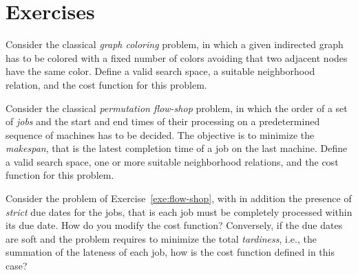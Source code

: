 \section{Exercises}

\begin{exercise}
Consider the classical \emph{graph coloring} problem, in which a given indirected graph has to be colored with a fixed number of colors avoiding that two adjacent nodes have the same color. Define a valid search space, a suitable neighborhood relation, and the cost function for this problem. 
\end{exercise}

\begin{exercise}\label{exe:flow-shop}
Consider the classical \emph{permutation flow-shop} problem, in which the order of a set of \emph{jobs} and the start and end times of their processing on a predetermined sequence of machines has to be decided. The objective is to minimize the \emph{makespan}, that is the latest completion time of a job on the last machine. Define a valid search space, one or more suitable neighborhood relations, and the cost function for this problem. 
\end{exercise}

\begin{exercise}
Consider the problem of Exercise~\ref{exe:flow-shop}, with in addition the presence of \emph{strict} due dates for the jobs, that is each job must be completely processed within its due date. How do you modify the cost function? Conversely, if the due dates are soft and the problem requires to minimize the total \emph{tardiness}, i.e., the summation of the lateness of each job, how is the cost function defined in this case?
\end{exercise}




